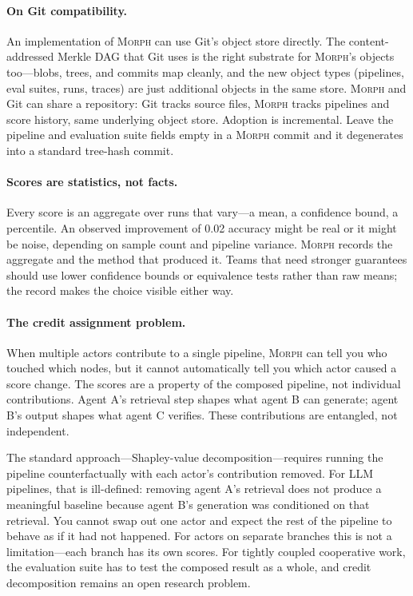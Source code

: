 \documentclass{article}
\begin{document}
\paragraph{On Git compatibility.}
An implementation of \textsc{Morph} can use Git's object store directly.
The content-addressed Merkle DAG that Git uses is the right substrate for
\textsc{Morph}'s objects too---blobs, trees, and commits map cleanly, and
the new object types (pipelines, eval suites, runs, traces) are just additional
objects in the same store. \textsc{Morph} and Git can share a repository:
Git tracks source files, \textsc{Morph} tracks pipelines and score history,
same underlying object store. Adoption is incremental. Leave the pipeline and
evaluation suite fields empty in a \textsc{Morph} commit and it degenerates
into a standard tree-hash commit.

\paragraph{Scores are statistics, not facts.}
Every score is an aggregate over runs that vary---a mean, a confidence bound,
a percentile. An observed improvement of 0.02 accuracy might be real or it
might be noise, depending on sample count and pipeline variance. \textsc{Morph}
records the aggregate and the method that produced it. Teams that need
stronger guarantees should use lower confidence bounds or equivalence tests
rather than raw means; the record makes the choice visible either way.

\paragraph{The credit assignment problem.}
When multiple actors contribute to a single pipeline, \textsc{Morph} can tell
you who touched which nodes, but it cannot automatically tell you which actor
caused a score change. The scores are a property of the composed pipeline, not
individual contributions. Agent A's retrieval step shapes what agent B can
generate; agent B's output shapes what agent C verifies. These contributions
are entangled, not independent.

The standard approach---Shapley-value decomposition---requires running the
pipeline counterfactually with each actor's contribution removed. For LLM
pipelines, that is ill-defined: removing agent A's retrieval does not produce
a meaningful baseline because agent B's generation was conditioned on that
retrieval. You cannot swap out one actor and expect the rest of the pipeline
to behave as if it had not happened. For actors on separate branches this is
not a limitation---each branch has its own scores. For tightly coupled
cooperative work, the evaluation suite has to test the composed result as a
whole, and credit decomposition remains an open research problem.
\end{document}
